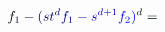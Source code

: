 \documentclass[12pt]{article}
\begin{document}
\makeatletter
\renewcommand*{\@textcolor}[3]{%
  \protect\leavevmode
  \begingroup
    \color#1{#2}#3%
  \endgroup
}
\makeatother
\begin{displaymath}
\mathcolor[RGB]{0,0,15}{f} _ { \mathcolor[RGB]{0,0,30}{1} } \mathcolor[RGB]{0,0,45}{-} \mathcolor[RGB]{0,0,60}{(} \mathcolor[RGB]{0,0,75}{s} \mathcolor[RGB]{0,0,90}{t} ^ { \mathcolor[RGB]{0,0,105}{d} } \mathcolor[RGB]{0,0,120}{f} _ { \mathcolor[RGB]{0,0,135}{1} } \mathcolor[RGB]{0,0,150}{-} \mathcolor[RGB]{0,0,165}{s} ^ { \mathcolor[RGB]{0,0,180}{d} \mathcolor[RGB]{0,0,195}{+} \mathcolor[RGB]{0,0,210}{1} } \mathcolor[RGB]{0,0,225}{f} _ { \mathcolor[RGB]{0,0,240}{2} } \mathcolor[RGB]{0,0,255}{)} ^ { \mathcolor[RGB]{0,15,0}{d} } \mathcolor[RGB]{0,15,15}{=} \,
\end{displaymath}
\end{document}
